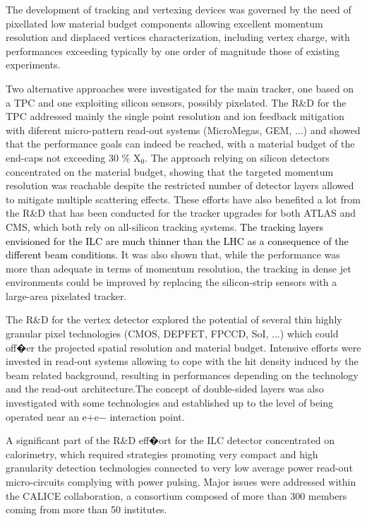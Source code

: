 \documentclass[%
 reprint,
 amsmath,amssymb,
 aps,
]{revtex4-1}
\newcommand{\jim}[1]{\textcolor{black}{#1}}
\begin{document}
The development of tracking and vertexing devices was governed by the need of pixellated low material budget components allowing excellent momentum resolution and displaced vertices characterization, including vertex charge, with performances exceeding typically by one order of magnitude those of existing experiments.

Two alternative approaches were investigated for the main tracker, one based on a TPC and one exploiting silicon sensors, possibly pixelated. The R\&D for the TPC addressed mainly the single point resolution and ion feedback mitigation with diferent micro-pattern read-out systems (MicroMegas, GEM, ...) and showed that the performance goals can indeed be reached, with a material budget of the end-caps not exceeding 30 \% X\jim{$_0$}. The approach relying on silicon detectors concentrated on the material budget, showing that the targeted momentum resolution was reachable despite the restricted number of detector layers allowed to mitigate multiple scattering effects. These efforts have also benefited a lot from the R\&D that has been conducted for the tracker upgrades for both ATLAS and CMS, which both rely on all-silicon tracking systems. 
\jim{The tracking layers 
envisioned for the ILC are much thinner than the LHC as a consequence of the different beam conditions.}
It was also shown that, while the performance was more than adequate in terms of momentum resolution, the tracking in dense jet environments could be improved by replacing the silicon-strip sensors with a large-area pixelated tracker. 

The R\&D for the vertex detector explored the potential of several thin highly granular pixel technologies (CMOS, DEPFET, FPCCD, SoI, ...) which could off�er the projected spatial resolution and material budget. Intensive efforts were invested in read-out systems allowing to cope with the hit density induced by the beam related background, resulting in performances depending on the technology and the read-out architecture.The concept of double-sided layers was also investigated with some technologies and established up to the level of being operated near an e+e− interaction point.

A significant part of the R\&D eff�ort for the ILC detector concentrated on calorimetry, which required strategies promoting very compact and high granularity detection technologies connected to very low average power read-out micro-circuits complying with power pulsing. Major issues were addressed within the CALICE collaboration, a consortium composed of more than 300 members coming from more than 50 institutes.
\end{document}
